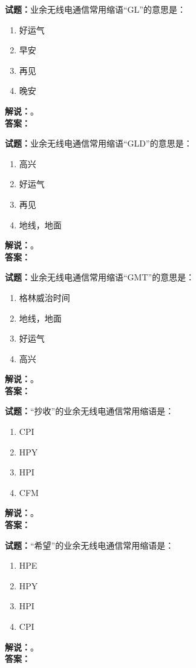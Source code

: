 \documentclass{ctexbook}
\begin{document}
\bigskip

\noindent\textbf{试题：}业余无线电通信常用缩语“GL”的意思是：
\begin{enumerate}[leftmargin=3em]
  \item 好运气
  \item 早安
  \item 再见
  \item 晚安
\end{enumerate}
\noindent\textbf{解说：}\textbf{}。\\\noindent\textbf{答案：}

\bigskip

\noindent\textbf{试题：}业余无线电通信常用缩语“GLD”的意思是：
\begin{enumerate}[leftmargin=3em]
  \item 高兴
  \item 好运气
  \item 再见
  \item 地线，地面
\end{enumerate}
\noindent\textbf{解说：}\textbf{}。\\\noindent\textbf{答案：}

\bigskip

\noindent\textbf{试题：}业余无线电通信常用缩语“GMT”的意思是：
\begin{enumerate}[leftmargin=3em]
  \item 格林威治时间
  \item 地线，地面
  \item 好运气
  \item 高兴
\end{enumerate}
\noindent\textbf{解说：}\textbf{}。\\\noindent\textbf{答案：}

\bigskip

\noindent\textbf{试题：}“抄收”的业余无线电通信常用缩语是：
\begin{enumerate}[leftmargin=3em]
  \item CPI
  \item HPY
  \item HPI
  \item CFM
\end{enumerate}
\noindent\textbf{解说：}\textbf{}。\\\noindent\textbf{答案：}

\bigskip

\noindent\textbf{试题：}“希望”的业余无线电通信常用缩语是：
\begin{enumerate}[leftmargin=3em]
  \item HPE
  \item HPY
  \item HPI
  \item CPI
\end{enumerate}
\noindent\textbf{解说：}\textbf{}。\\\noindent\textbf{答案：}
\end{document}

